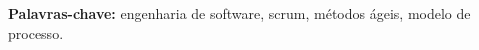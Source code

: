 \documentclass[11pt,twoside,a4paper]{book}
\begin{document}
\noindent \textbf{Palavras-chave:} engenharia de software, scrum, métodos ágeis, modelo de processo.



\tableofcontents    %



\listoffigures
\listoftables

\mainmatter

\fancyhead[RE,LO]{\thesection}

\singlespacing              %




\backmatter \singlespacing   %
\end{document}
